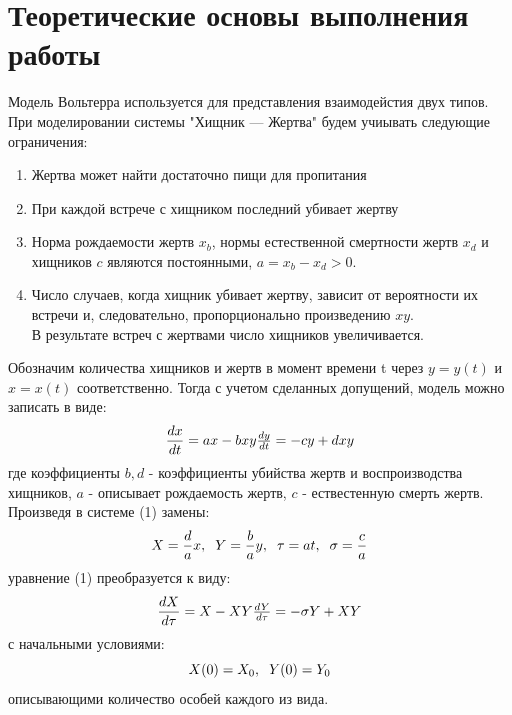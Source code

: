 \documentclass[a4paper,12pt]{article}
\begin{document}
\section{Теоретические основы выполнения работы}
\hspace{0.5cm} Модель Вольтерра используется для представления взаимодейстия двух типов. 
При моделировании системы "Хищник --- Жертва" будем учиывать следующие ограничения:
\begin{enumerate}
    \item Жертва может найти достаточно пищи для пропитания
    \item При каждой встрече с хищником последний убивает жертву
    \item Норма рождаемости жертв $x_b$, нормы естественной смертности жертв $x_d$ и\\
    хищников $c$ являются постоянными, $a = x_b - x_d > 0$.
    \item Число случаев, когда хищник убивает жертву, зависит от вероятности их
    встречи и, следовательно, пропорционально произведению $xy$. \\
    В результате встреч с жертвами число хищников увеличивается.
\end{enumerate}

Обозначим количества хищников и жертв в момент времени t через $y = y(t)$ и $x = x(t)$
соответственно. Тогда с учетом сделанных допущений, модель можно записать в виде:
\begin{equation}
    \frac{dx}{dt} = ax - bxy $$ $$
    \frac{dy}{dt} = -cy + dxy
\end{equation}
где коэффициенты $b, d$ - коэффициенты убийства жертв и воспроизводства хищников,
$a$ - описывает рождаемость жертв, $c$ - ествестенную смерть жертв. $$ $$
Произведя в системе (1) замены:
\begin{equation}
    X = \frac{d}{a}x, \hspace{0.2cm} Y = \frac{b}{a}y, \hspace{0.2cm} \tau = at, \hspace{0.2cm} \sigma = \frac{c}{a}
\end{equation}
уравнение (1) преобразуется к виду:
\begin{equation}
    \frac{dX}{d\tau} = X - XY $$ $$
    \frac{dY}{d\tau} = -\sigma Y + XY
\end{equation}
с начальными условиями:
\begin{equation}
    X(0) = X_0, \hspace{0.2cm} Y(0) = Y_0
\end{equation}
описывающими количество особей каждого из вида.
\newpage
\end{document}

